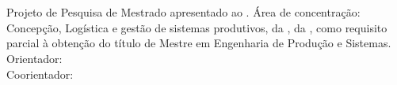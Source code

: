 \begin{center}
    {\singlespacing
    \MakeUppercase{\textbf{\aluno}} \\ [5cm]

    \MakeUppercase{\titulo}\\ [1cm]
    
    \hspace{.45\textwidth} %
        \begin{minipage}{.5\textwidth}
        \noindent Projeto de Pesquisa de Mestrado apresentado ao \curso. Área de concentração: Concepção, Logística e gestão de sistemas produtivos, da \departamento, da \universidade, como requisito parcial à obtenção do título de Mestre em Engenharia de Produção e Sistemas.\\ [5mm]
        \noindent Orientador: \orientador\\
        \noindent Coorientador: \coorientador
        \end{minipage}
    
    \vfill
    
    \MakeUppercase{\cidade} \\ 
    \ano}
\end{center}